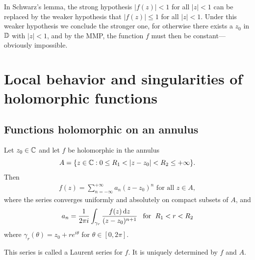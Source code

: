 \begin{remark}
In Schwarz's lemma, the strong hypothesis $|f(z)|<1$ for all $|z|<1$ can be replaced by the weaker hypothesis that $|f(z)|\leq 1$ for all $|z|<1$. Under this weaker hypothesis we conclude the stronger one, for otherwise there exists a $z_0$ in $\mathbb{D}$ with $|z|<1$, and by the MMP, the function $f$ must then be constant---obviously impossible.
\end{remark}
\section{Local behavior and singularities of holomorphic functions}
\subsection{Functions holomorphic on an annulus}
\begin{theorem}
Let $z_0\in\mathbb{C}$ and let $f$ be holomorphic in the annulus
\[A=\{z\in\C:0\leq R_1<|z-z_0|<R_2\leq+\infty\}.\]
Then
\begin{align}\label{Laurent exapnsion}
f(z)=\sum_{n=-\infty}^{+\infty}a_n(z-z_0)^n\text{ for all }z\in A,
\end{align}
where the series converges uniformly and absolutely on compact subsets of $A$, and
\[a_n=\frac{1}{2\pi i}\int_{\gamma_r}\frac{f(z)\mathop{}\!\mathrm{d} z}{(z-z_0)^{n+1}}\hspace{8pt}\text{for}\hspace{6pt} R_1<r<R_2\]
where $\gamma_r(\theta)=z_0+re^{i\theta}$ for $\theta\in[0,2\pi]$.
\end{theorem}
This series is called a Laurent series for $f$. It is uniquely determined by $f$ and $A$.
